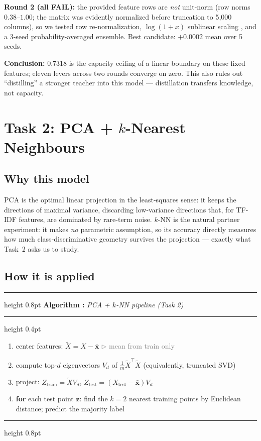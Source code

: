 \documentclass[11pt,a4paper]{article}
\newcounter{algctr}
\newenvironment{algo}[1]{%
  \par\medskip\refstepcounter{algctr}%
  \noindent\hrule height 0.8pt \smallskip
  \noindent\textbf{Algorithm \thealgctr:} \emph{#1}\par\smallskip
  \hrule height 0.4pt \smallskip
  \begin{enumerate}\setlength{\itemsep}{1pt}\setlength{\parskip}{0pt}%
}{%
  \end{enumerate}\smallskip\hrule height 0.8pt \medskip
}
\newcommand{\stateComment}[1]{\hfill\textcolor{gray}{\footnotesize $\triangleright$ #1}}
\begin{document}
\textbf{Round 2 (all FAIL):} the provided feature rows are \emph{not} unit-norm (row norms $0.38$--$1.00$; the matrix was evidently normalized before truncation to 5{,}000 columns), so we tested row re-normalization, $\log(1+x)$ sublinear scaling \cite{manning2008}, and a 3-seed probability-averaged ensemble. Best candidate: $+0.0002$ mean over 5 seeds.

\textbf{Conclusion:} $0.7318$ is the capacity ceiling of a linear boundary on these fixed features; eleven levers across two rounds converge on zero. This also rules out ``distilling'' a stronger teacher into this model --- distillation transfers knowledge, not capacity.

\section{Task 2: PCA + $k$-Nearest Neighbours}\label{sec:task2}

\subsection{Why this model}
PCA \cite{pearson1901,jolliffe2002} is the optimal linear projection in the least-squares sense: it keeps the directions of maximal variance, discarding low-variance directions that, for TF-IDF features, are dominated by rare-term noise. $k$-NN \cite{cover1967} is the natural partner experiment: it makes \emph{no} parametric assumption, so its accuracy directly measures how much class-discriminative geometry survives the projection --- exactly what Task~2 asks us to study.

\subsection{How it is applied}
\begin{algo}{PCA + $k$-NN pipeline (Task 2)}
\item center features: $\tilde{X} = X - \bar{\mathbf{x}}$ \stateComment{mean from train only}
\item compute top-$d$ eigenvectors $V_d$ of $\tfrac{1}{m}\tilde{X}^\top \tilde{X}$ (equivalently, truncated SVD)
\item project: $Z_{\text{train}} = \tilde{X} V_d$, \quad $Z_{\text{test}} = (X_{\text{test}} - \bar{\mathbf{x}}) V_d$
\item \textbf{for} each test point $\mathbf{z}$: find the $k{=}2$ nearest training points by Euclidean distance; predict the majority label
\end{algo}
\end{document}
